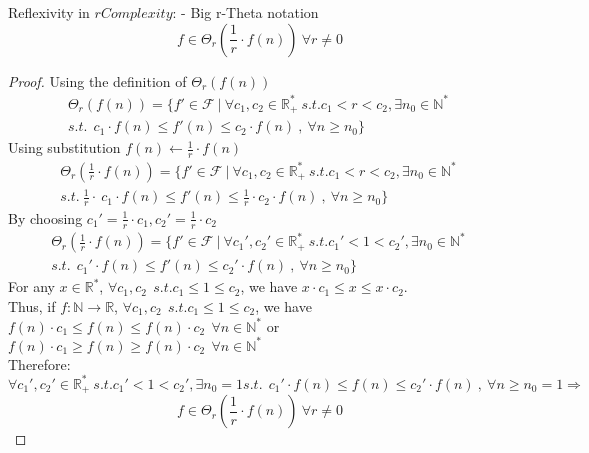 \begin{theorem}
    Reflexivity in $rComplexity$: - Big r-Theta notation  \[ f \in \Theta_{r} \left( \frac{1}{r} \cdot f(n) \right)\ \forall r \neq 0 \]
\end{theorem}
\begin{proof}
    Using the definition of $ \Theta_{r}(f(n))$
    \[\begin{split}
          \Theta_{r}(f(n)) = \lbrace f' \in \mathcal{F}\ |\ \forall c_{1}, c_{2} \in \mathbb{R}^{*}_{+} \ s.t. c_{1}< r < c_{2} , \exists n_{0} \in \mathbb{N}^{*}\ \\ s.t.\ \ c_{1} \cdot f(n) \leq f'(n) \leq c_{2} \cdot f(n)\ ,\  \forall n \geq n_{0} \rbrace
    \end{split} \]
    Using substitution $ f(n) \longleftarrow \frac{1}{r} \cdot f(n)$
    \[\begin{split}
          \Theta_{r} \left( \frac{1}{r} \cdot f(n) \right) = \lbrace f' \in \mathcal{F}\ |\ \forall c_{1}, c_{2} \in \mathbb{R}^{*}_{+} \ s.t. c_{1}< r < c_{2} , \exists n_{0} \in \mathbb{N}^{*}\ \\ s.t.\ \frac{1}{r} \cdot \ c_{1} \cdot f(n) \leq  f'(n) \leq \frac{1}{r} \cdot c_{2} \cdot f(n)\ ,\  \forall n \geq n_{0} \rbrace
    \end{split} \]
    By choosing $c_{1}' = \frac{1}{r} \cdot c_{1}, c_{2}' = \frac{1}{r} \cdot c_{2}$
    \[\begin{split}
          \Theta_{r} \left( \frac{1}{r} \cdot f(n) \right) = \lbrace f' \in \mathcal{F}\ |\ \forall c_{1}', c_{2}' \in \mathbb{R}^{*}_{+} \ s.t. c_{1}'< 1 < c_{2}' , \exists n_{0} \in \mathbb{N}^{*}\ \\ s.t.\  \ c_{1}' \cdot f(n) \leq  f'(n) \leq c_{2}' \cdot f(n)\ ,\  \forall n \geq n_{0} \rbrace
    \end{split} \]
    For any $x \in \mathbb{R}^{*}$,  $\forall c_{1}, c_{2}\ \ s.t. c_{1} \leq 1 \leq c_{2}$, we have $ x \cdot c_{1} \leq x \leq x \cdot c_{2} $. \\
    Thus, if $f:\mathbb{N}\longrightarrow\mathbb{R}$, $\forall c_{1}, c_{2}\ \  s.t. c_{1} \leq 1 \leq c_{2}$, we have $f(n) \cdot c_{1} \leq f(n) \leq f(n) \cdot c_{2}\ \ \forall n \in \mathbb{N}^{*}$ or $f(n) \cdot c_{1} \geq f(n) \geq f(n) \cdot c_{2}\ \ \forall n \in \mathbb{N}^{*}$\\

    Therefore:
    \[\forall c_{1}', c_{2}' \in \mathbb{R}^{*}_{+} \ s.t. c_{1}'< 1 < c_{2}' , \exists n_{0} = 1 s.t.\  \ c_{1}' \cdot f(n) \leq  f(n) \leq c_{2}' \cdot f(n)\ ,\  \forall n \geq n_{0}=1 \Rightarrow \]
    \[ f \in \Theta_{r} \left( \frac{1}{r} \cdot f(n) \right)\ \forall r \neq 0 \]
\end{proof}


